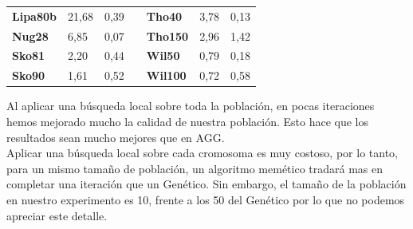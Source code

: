 \documentclass[a4paper, 12pt]{article}
\begin{document}
\begin{table}[H]
\begin{tabular}{|l|l|l|l|l|l|l|}
\textbf{Lipa80b}                    & 21,68                              & 0,39                                 &                       & \textbf{Tho40}                     & 3,78                               & 0,13                                 \\ \cline{1-3} \cline{5-7} 
\textbf{Nug28}                      & 6,85                               & 0,07                                 &                       & \textbf{Tho150}                    & 2,96                               & 1,42                                 \\ \cline{1-3} \cline{5-7} 
\textbf{Sko81}                      & 2,20                               & 0,44                                 &                       & \textbf{Wil50}                     & 0,79                               & 0,18                                 \\ \cline{1-3} \cline{5-7} 
\textbf{Sko90}                      & 1,61                               & 0,52                                 &                       & \textbf{Wil100}                    & 0,72                               & 0,58                                 \\ \cline{1-3} \cline{5-7} 
\end{tabular}
\end{table}

	Al aplicar una búsqueda local sobre toda la población, en pocas iteraciones hemos mejorado mucho la calidad de nuestra población. Esto hace que los resultados sean mucho mejores que en AGG.\\

	Aplicar una búsqueda local sobre cada cromosoma es muy costoso, por lo tanto, para un mismo tamaño de población, un algoritmo memético tradará mas en completar una iteración que un Genético. Sin embargo, el tamaño de la población en nuestro experimento es 10, frente a los 50 del Genético por lo que no podemos apreciar este detalle. 
\end{document}
